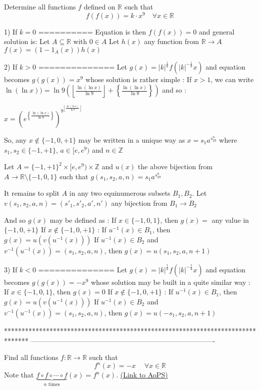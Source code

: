 \begin{solution}
	\begin{tcolorbox}Determine all functions $f$ defined on $\mathbb R$  such that \[ f (f (x)) = k \cdot  x ^ {9} \quad \forall x\in\mathbb R\]\end{tcolorbox}
1) If $k=0$
==========
Equation is then $f(f(x))=0$ and general solution is:
Let $A\subseteq\mathbb R$ with $0\in A$
Let $h(x)$ any function from $\mathbb R\to A$
$f(x)=(1-1_{A}(x))h(x)$

2) If $k>0$
==============
Let $g(x)=|k|^{\frac 18}f(|k|^{-\frac 18}x)$ and equation becomes $g(g(x))=x^9$ whose solution is rather simple :
If $x>1$, we can write $\ln(\ln x))=\ln 9(\left\lfloor\frac{\ln(\ln x)}{\ln 9}\right\rfloor+\left\{\frac{\ln(\ln x)}{\ln 9}\right\})$ and so :

$x=(e^{\left\{\frac{\ln(\ln x)}{\ln 9}\right\}})^{9^{\left\lfloor\frac{\ln(\ln x)}{\ln 9}\right\rfloor}}$

So, any $x\notin\{-1,0,+1\}$ may be written in a unique way as $x=s_1 a^{s_29^n}$ where $s_1,s_2\in\{-1,+1\}$, $a\in[e,e^9)$ and $n\in\mathbb Z$

Let $A=\{-1,+1\}^2\times [e,e^9)\times \mathbb Z$ and $u(x)$ the above bijection from $A\to\mathbb R\setminus\{-1,0,1\}$ such that $g(s_1,s_2,a,n)=s_1 a^{s_29^n}$

It remains to split $A$ in any two equinumerous subsets $B_1,B_2$.
Let $v(s_1,s_2,a,n)=(s'_1,s'_2,a',n')$ any bijection from $B_1\to B_2$

And so $g(x)$ may be defined as :
If $x\in\{-1,0,1\}$, then $g(x)=$ any value in $\{-1,0,+1\}$
If $x\notin\{-1,0,+1\}$ :
If $u^{-1}(x)\in B_1$, then $g(x)=u(v(u^{-1}(x)))$
If $u^{-1}(x)\in B_2$ and $v^{-1}(u^{-1}(x))=(s_1,s_2,a,n)$, then $g(x)=u(s_1,s_2,a,n+1)$

3) If $k<0$
==============
Let $g(x)=|k|^{\frac 18}f(|k|^{-\frac 18}x)$ and equation becomes $g(g(x))=-x^9$ whose solution may be built in a quite similar way :
If $x\in\{-1,0,1\}$, then $g(x)=0$ 
If $x\notin\{-1,0,+1\}$ :
If $u^{-1}(x)\in B_1$, then $g(x)=u(v(u^{-1}(x)))$
If $u^{-1}(x)\in B_2$ and $v^{-1}(u^{-1}(x))=(s_1,s_2,a,n)$, then $g(x)=u(-s_1,s_2,a,n+1)$
\end{solution}
*******************************************************************************
-------------------------------------------------------------------------------

\begin{problem}
	Find all functions $f: \mathbb R \to\mathbb R$ such that \[f ^ {n} (x) =-x \quad\ \forall x\in\mathbb R\]
Note that $ \underbrace{f{\circ}f{\circ}\cdots{\circ}f}_{n \textrm{ times}}(x)=f^{n}(x) $.
	\flushright \href{https://artofproblemsolving.com/community/c6h565938}{(Link to AoPS)}
\end{problem}



